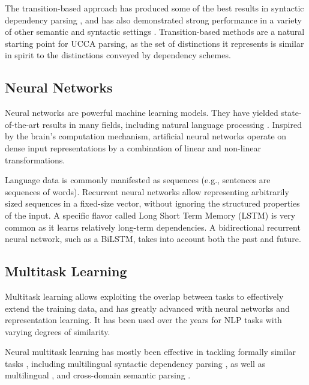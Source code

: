 \documentclass[12pt,a4paper,table]{report}
\begin{document}
The transition-based approach has produced some of the best
results in syntactic dependency parsing
\citep{kiperwasser2016simple,andor2016globally}, and has also demonstrated
strong performance in a variety of other semantic and syntactic settings
\citep{maier2015discontinuous,damonte-17}.
Transition-based methods are a natural starting point for UCCA parsing,
as the set of distinctions it represents is similar in spirit to the distinctions
conveyed by dependency schemes.


\subsection*{Neural Networks}

Neural networks are powerful machine learning models.
They have yielded state-of-the-art results in many fields,
including natural language processing \citep{goldberg2016primer}.
Inspired by the brain's computation mechanism,
artificial neural networks operate on dense input representations
by a combination of linear and non-linear transformations.

Language data is commonly manifested as sequences
(e.g., sentences are sequences of words).
Recurrent neural networks \citep{elman1990finding} allow representing
arbitrarily sized sequences in a fixed-size vector,
without ignoring the structured properties of the input.
A specific flavor called Long Short Term Memory
(LSTM) is very common as it learns relatively long-term dependencies.
A bidirectional recurrent neural network, such as a BiLSTM,
takes into account both the past and future.


\subsection*{Multitask Learning}

Multitask learning \citep{caruana1998multitask} allows exploiting the overlap between tasks
to effectively extend the training data, 
and has greatly advanced with neural networks and representation learning.
It has been used over the years for NLP tasks with varying degrees of similarity.

Neural multitask learning has mostly been effective in tackling formally similar
tasks \citep{P16-2038},
including
multilingual syntactic dependency parsing \citep{Q16-1031,guo2016exploiting},
as well as multilingual \citep{duong2017multilingual},
and cross-domain semantic parsing \citep{herzig-berant:2017:Short,W17-2607}.
\end{document}

